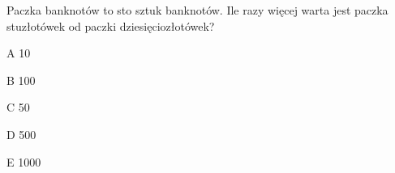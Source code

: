 \begin{tresc}
Paczka banknotów to sto sztuk banknotów. Ile razy więcej warta jest paczka stuzłotówek od paczki dziesięciozłotówek?
\end{tresc}
\begin{wariant}{A} 10 \end{wariant}
\begin{wariant}{B} 100 \end{wariant}
\begin{wariant}{C} 50 \end{wariant}
\begin{wariant}{D} 500 \end{wariant}
\begin{wariant}{E} 1000 \end{wariant}
